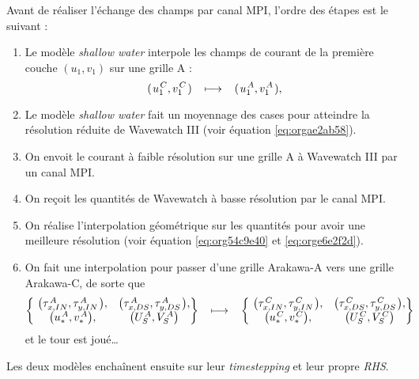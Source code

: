\documentclass[10pt]{report}
\numberwithin{equation}{section}
\newcommand{\pt}{\hspace{1pt}} %
\begin{document}
Avant de réaliser l'échange des champs par canal MPI, l'ordre des étapes est le suivant :
\begin{enumerate}
\item Le modèle \emph{shallow water} interpole les champs de courant de la première couche \((u_1,v_1)\) sur une grille A :
\begin{equation}
   (\pt u_1^{\pt C},v_1^{\pt C}\pt) \hspace{0.3cm}\longmapsto \hspace{0.3cm} (\pt u_1^{\pt A},v_1^{\pt A}\pt),
\end{equation}
\item Le modèle \emph{shallow water} fait un moyennage des cases pour atteindre la résolution réduite de Wavewatch III (voir équation \ref{eq:orgae2ab58}).
\item On envoit le courant à faible résolution sur une grille A à Wavewatch III par un canal MPI.
\item On reçoit les quantités de Wavewatch à basse résolution par le canal MPI.
\item On réalise l'interpolation géométrique sur les quantités pour avoir une meilleure résolution (voir équation \ref{eq:org54c9e40} et \ref{eq:orge6e2f2d}).
\item On fait une interpolation pour passer d'une grille Arakawa-A vers une grille Arakawa-C, de sorte que
\begin{equation}\qty{\
   \begin{matrix}
     \qty(\tau_{x,IN}^{\pt A},\tau_{y,IN}^{\pt A}\pt), &
     \qty(\tau_{x,DS}^{\pt A},\tau_{y,DS}^{\pt A}\pt), \\
     \qty(u_*^{\pt A},v_*^{\pt A}),   &
     \qty(U_S^{\pt A},V_S^{\pt A})
   \end{matrix}}
   \hspace{0.3cm}\longmapsto \hspace{0.3cm}\qty{\
   \begin{matrix}
     \qty(\tau_{x,IN}^{\pt C},\tau_{y,IN}^{\pt C}\pt), &
     \qty(\tau_{x,DS}^{\pt C},\tau_{y,DS}^{\pt C}\pt), \\
     \qty(u_*^{\pt C},v_*^{\pt C}),   &
     \qty(U_S^{\pt C},V_S^{\pt C})
   \end{matrix}}
   \end{equation}
et le tour est joué\ldots{}\bigskip
\end{enumerate}

Les deux modèles enchaînent ensuite sur leur \emph{timestepping} et leur propre \emph{RHS}.
\end{document}
